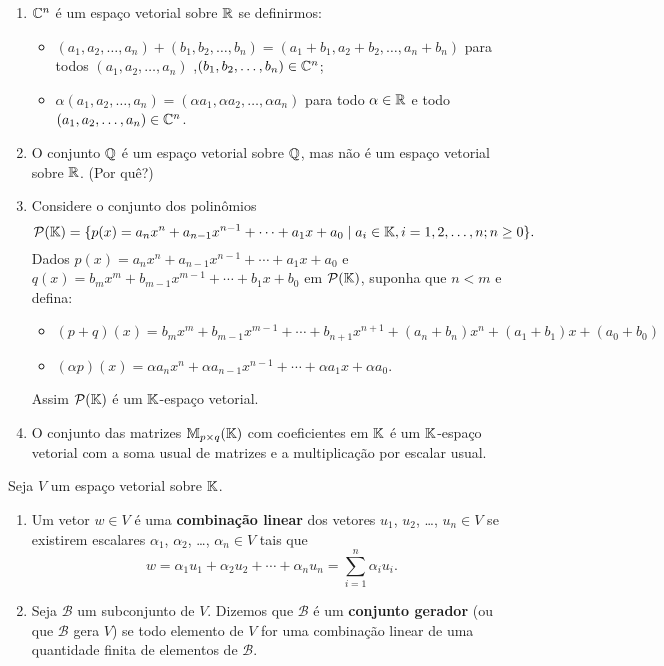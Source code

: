 \begin{exemplo}
\begin{enumerate}
\begin{itemize}
		\end{itemize}
		\item $\mathbb{C}^n$ \'e um espa\c{c}o vetorial sobre $\mathbb{R}$ se definirmos:
		\begin{itemize}
			\item $(a_1, a_2, \dots, a_n) + (b_1, b_2, \dots,b_n) = (a_1 + b_1, a_2 + b_2,\dots, a_n + b_n)$ para todos $(a_1, a_2, \dots,a_n)$ ,$(b_1, b_2, \dots,b_n) \in \mathbb{C}^n$;
			\item $\alpha (a_1, a_2, \dots,a_n) = (\alpha a_1, \alpha a_2, \dots, \alpha a_n)$ para todo $\alpha \in \mathbb{R}$ e todo $(a_1, a_2, \dots, a_n) \in \mathbb{C}^n$.
		\end{itemize}
		\item O conjunto $\mathbb{Q}$ \'e um espa\c{c}o vetorial sobre $\mathbb{Q}$, mas n\~ao \'e um espa\c{c}o vetorial sobre $\mathbb{R}$. (Por qu\^e?)
		\item Considere o conjunto dos polin\^omios
		\[
			\mathcal{P}(\mathbb{K}) = \{ p(x) = a_nx^n + a_{n - 1}x^{n - 1} + \cdots + a_1x + a_0 \mid a_i \in \mathbb{K}, i = 1, 2, \dots, n; n \ge 0 \}.
		\]
		Dados $p(x) = a_nx^n + a_{n - 1}x^{n - 1} + \cdots + a_1x + a_0$ e $q(x) = b_mx^m + b_{m - 1}x^{m - 1} + \cdots + b_1x + b_0$ em $\mathcal{P}(\mathbb{K})$, suponha que $n < m$ e defina:
		\begin{itemize}
			\item $(p + q)(x) = b_mx^m + b_{m - 1}x^{m - 1} + \cdots + b_{n + 1}x^{n + 1} + (a_n + b_n)x^n + (a_1 + b_1)x + (a_0 + b_0)$
			\item $(\alpha p)(x) = \alpha a_nx^n + \alpha a_{n - 1}x^{n - 1} + \cdots + \alpha a_1x + \alpha a_0$.
		\end{itemize}
		Assim $\mathcal{P}(\mathbb{K})$ \'e um $\mathbb{K}$-espa\c{c}o vetorial.
		\item O conjunto das matrizes $\mathbb{M}_{p \times q}(\mathbb{K})$ com coeficientes em $\mathbb{K}$ \'e um $\mathbb{K}$-espa\c{c}o vetorial com a soma usual de matrizes e a multiplica\c{c}\~ao por escalar usual.
	\end{enumerate}
\end{exemplo}

\begin{definicao}
	Seja $V$ um espa\c{c}o vetorial sobre $\mathbb{K}$.
	\begin{enumerate}
		\item Um vetor $w \in V$ \'e uma \textbf{combina\c{c}\~ao linear} dos vetores $u_1$, $u_2$, \dots, $u_n \in V$ se existirem escalares $\alpha_1$, $\alpha_2$, \dots, $\alpha_n \in V$ tais que
		\[
			w = \alpha_1 u_1 + \alpha_2u_2 + \cdots + \alpha_nu_n = \sum_{i = 1}^n \alpha_iu_i.
		\]
		\item Seja $\mathcal{B}$ um subconjunto de $V$. Dizemos que $\mathcal{B}$ \'e um \textbf{conjunto gerador} (ou que $\mathcal{B}$ gera $V$) se todo elemento de $V$ for uma combina\c{c}\~ao linear de uma quantidade finita de elementos de $\mathcal{B}$.
	\end{enumerate}
\end{definicao}

